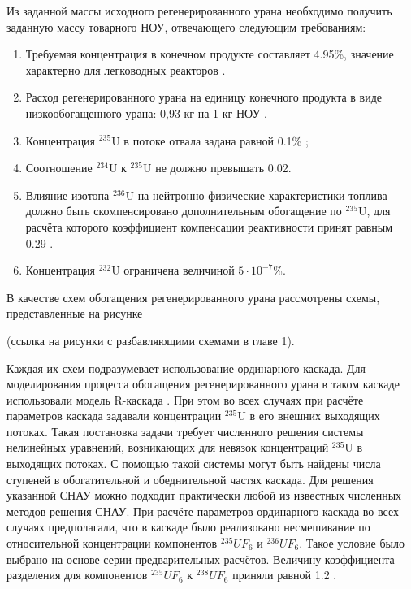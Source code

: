 Из заданной массы исходного регенерированного урана необходимо получить заданную массу товарного НОУ, отвечающего следующим требованиям:

\begin{enumerate}
  \item Требуемая концентрация в конечном продукте составляет 4.95\%, значение характерно для легководных реакторов \cite{solovevaCennostiOYaTKak2019}.
  \item Расход регенерированного урана на единицу конечного продукта в виде низкообогащенного урана: 0,93 кг на 1 кг НОУ \cite{smirnovApplyingEnrichmentCapacities2018}.
  \item Концентрация $^{235}$U в потоке отвала задана равной 0.1\% \cite{smirnovEvolutionIsotopicComposition2012};
  \item Соотношение $^{234}$U к $^{235}$U не должно превышать 0.02.
  \item Влияние изотопа $^{236}$U на нейтронно-физические характеристики топлива должно быть скомпенсировано дополнительным обогащение по $^{235}$U, для расчёта которого коэффициент компенсации реактивности принят равным 0.29 \cite{smirnovApplyingEnrichmentCapacities2018}.
  \item Концентрация $^{232}$U ограничена величиной $5\cdot10^{-7}$\%.
\end{enumerate}

В качестве схем обогащения регенерированного урана рассмотрены схемы, представленные на рисунке

(ссылка на рисунки с разбавляющими схемами в главе 1).

Каждая их схем подразумевает использование ординарного каскада. Для моделирования процесса обогащения регенерированного урана в таком каскаде использовали модель R-каскада \cite{sulaberidzeTeoriyaKaskadovDlya2011}. При этом во всех случаях при расчёте параметров каскада задавали концентрации $^{235}$U в его внешних выходящих потоках. Такая постановка задачи требует численного решения системы нелинейных уравнений, возникающих для невязок концентраций $^{235}$U в выходящих потоках. С помощью такой системы могут быть найдены числа ступеней в обогатительной и обеднительной частях каскада. Для решения указанной СНАУ можно подходит практически любой из известных численных методов решения СНАУ. 
При расчёте параметров ординарного каскада во всех случаях предполагали, что в каскаде было реализовано несмешивание по относительной концентрации компонентов $^{235}UF_6$ и $^{236}UF_6$. Такое условие было выбрано на основе серии предварительных расчётов. Величину коэффициента разделения для компонентов  $^{235}UF_6$ к $^{238}UF_6$ приняли равной 1.2  \cite{smirnovEvolutionIsotopicComposition2012}. 


